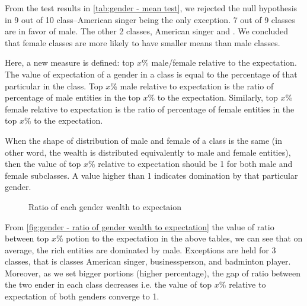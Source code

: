 From the test results in \autoref{tab:gender - mean test}, we rejected the null hypothesis in 9 out of 10 class--American singer being the only exception. 7 out of 9 classes are in favor of male. The other 2 classes, American singer and . We concluded that female classes are more likely to have smaller means than male classes.

Here, a new measure is defined: top \(x\)\% male/female relative to the expectation. The value of expectation of a gender in a class is equal to the percentage of that particular in the class. Top \(x\)\% male relative to expectation is the ratio of percentage of male entities in the top \(x\)\% to the expectation. Similarly, top \(x\)\% female relative to expectation is the ratio of percentage of female entities in the top \(x\)\% to the expectation.

When the shape of distribution of male and female of a class is the same (in other word, the wealth is distributed equivalently to male and female entities), then the value of top \(x\)\% relative to expectation should be 1 for both male and female subclasses. A value higher than 1 indicates domination by that particular gender.

\begin{figure}[htp]
\centering 
{}


\caption{Ratio of each gender wealth to expectaion} \label{fig:gender - ratio of gender wealth to expectation}

\end{figure}

From \autoref{fig:gender - ratio of gender wealth to expectation} the value of ratio between top \(x\)\% potion to the expectation in the above tables, we can see that on average, the rich entities are dominated by male. Exceptions are held for 3 classes, that is classes American singer, businessperson, and badminton player. Moreover, as we set bigger portions (higher percentage), the gap of ratio between the two ender in each class decreases i.e. the value of top \(x\)\% relative to expectation of both genders converge to 1.
